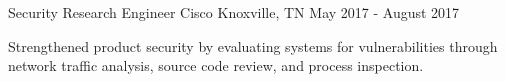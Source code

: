 \begin{cventries}
  \cventry
    {Security Research Engineer} %
    {Cisco} %
    {Knoxville, TN} %
    {May 2017 - August 2017} %
    {
      \begin{cvitems}
        \item {Strengthened product security by evaluating systems for vulnerabilities through network traffic analysis, source code review, and process inspection.}
      \end{cvitems}
    }


\end{cventries}